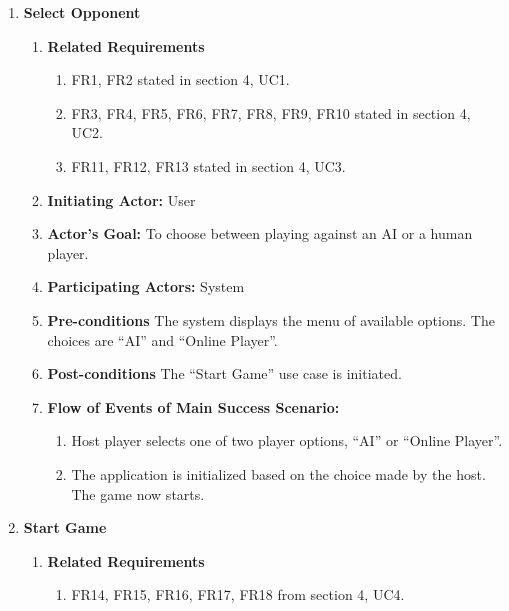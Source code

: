 \documentclass[]{article}
\begin{document}
\begin{enumerate}[{UC}1.]
    \item \textbf{Select Opponent}
        \begin{enumerate}[{ }]
            \item \textbf{Related Requirements}
                \begin{enumerate}
                    \item FR1, FR2 stated in section 4, UC1.
                    \item FR3, FR4, FR5, FR6, FR7, FR8, FR9, FR10 stated in section 4, UC2.
                    \item FR11, FR12, FR13 stated in section 4, UC3.
                \end{enumerate}
            
            \item \textbf{Initiating Actor:} 
                User

            \item \textbf{Actor's Goal:} 
                To choose between playing against an AI or a human player.
            
            \item \textbf{Participating Actors:} 
                System
            
            \item \textbf{Pre-conditions}
                The system displays the menu of available options. The choices are ``AI'' and ``Online Player''.
            
            \item \textbf{Post-conditions}
                The ``Start Game'' use case is initiated.
                
            \item \textbf{Flow of Events of Main Success Scenario:}
               \begin{enumerate}
                    \item Host player selects one of two player options, ``AI'' or ``Online Player''.
                    \item The application is initialized based on the choice made by the host. The game now starts.
                \end{enumerate}
        \end{enumerate}

    \item \textbf{Start Game}
        \begin{enumerate}[{ }]
            \item \textbf{Related Requirements}
                \begin{enumerate}
                    \item FR14, FR15, FR16, FR17, FR18 from section 4, UC4.
                \end{enumerate}
            

\end{enumerate}
\end{enumerate}
\end{document}
